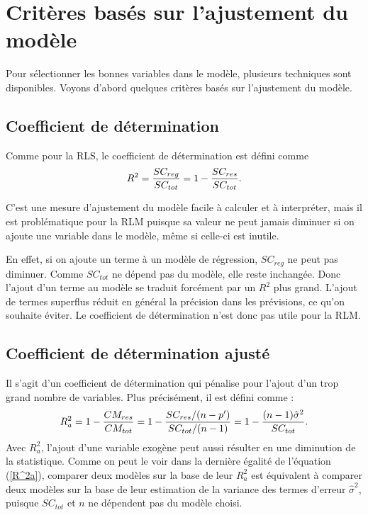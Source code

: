 \newpage

\section{Critères basés sur l'ajustement du modèle}

Pour sélectionner les bonnes variables dans le modèle, plusieurs techniques sont disponibles. Voyons d'abord quelques critères basés sur l'ajustement du modèle.

\subsection{Coefficient de détermination}

Comme pour la RLS, le coefficient de détermination est défini comme
\begin{equation}\label{R^2}
R^2={SC_{reg}\over SC_{tot}}=1-{SC_{res}\over SC_{tot}}.
\end{equation}

C'est une mesure d'ajustement du modèle facile à calculer et à interpréter, mais il est problématique pour la RLM puisque sa valeur ne peut jamais diminuer si on ajoute une variable dans le modèle, même si celle-ci est inutile.

En effet, si on ajoute un terme à un modèle de régression, $SC_{reg}$ ne peut pas diminuer. Comme $SC_{tot}$ ne dépend pas du modèle, elle reste inchangée. Donc l'ajout d'un terme au modèle se traduit forcément par un $R^2$ plus grand.
L'ajout de termes superflus réduit en général la précision dans les prévisions, ce qu'on souhaite éviter. Le coefficient de détermination n'est donc pas utile pour la RLM.

\subsection{Coefficient de détermination ajusté}

Il s'agit d'un coefficient de détermination qui pénalise pour l'ajout d'un trop grand nombre de variables. Plus précisément, il est défini comme :
\begin{equation}\label{R^2a}
R^2_{a}=1-{CM_{res}\over CM_{tot}}=1-{SC_{res}/(n-p')\over
SC_{tot}/(n-1)}=1-{(n-1)\hat\sigma^2\over SC_{tot}}.
\end{equation}
Avec $R^2_{a}$, l'ajout d'une variable exogène peut aussi
résulter en une diminution de la statistique.
Comme on peut le voir dans la dernière
égalité de l'équation (\ref{R^2a}), comparer deux
modèles sur la base de leur $R^2_{a}$ est équivalent à
comparer deux modèles sur la base de leur estimation de la
variance des termes d'erreur $\hat\sigma^2$, puisque $SC_{tot}$ et $n$ ne
dépendent pas du modèle choisi.

